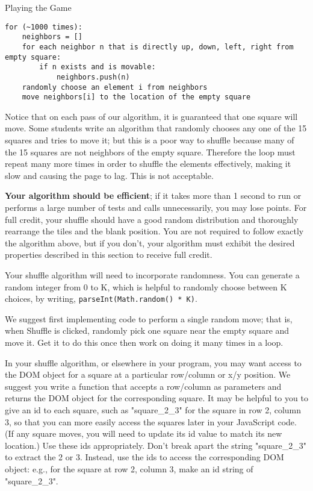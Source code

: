 \documentclass[programming]{../../../../mfcs}
\begin{document}
\begin{question}{Playing the Game}
\begin{lstlisting}
for (~1000 times):
    neighbors = []
    for each neighbor n that is directly up, down, left, right from empty square:
        if n exists and is movable:
            neighbors.push(n)
    randomly choose an element i from neighbors
    move neighbors[i] to the location of the empty square
\end{lstlisting}

Notice that on each pass of our algorithm, it is guaranteed that one square will move. Some students write an
algorithm that randomly chooses any one of the 15 squares and tries to move it; but this is a poor way to shuffle
because many of the 15 squares are not neighbors of the empty square. Therefore the loop must repeat many more
times in order to shuffle the elements effectively, making it slow and causing the page to lag. This is not acceptable.
\newline

\textbf{Your algorithm should be efficient}; if it takes more than 1 second to run or performs a large number of tests and
calls unnecessarily, you may lose points. For full credit, your shuffle should have a good random distribution and
thoroughly rearrange the tiles and the blank position. You are not required to follow exactly the algorithm above,
but if you don't, your algorithm must exhibit the desired properties described in this section to receive full credit.
\newline

Your shuffle algorithm will need to incorporate randomness. You can generate a random integer from 0 to K,
  which is helpful to randomly choose between K choices, by writing, \texttt{parseInt(Math.random() * K)}.
\newline

We suggest first implementing code to perform a single random move; that is, when Shuffle is clicked, randomly pick
one square near the empty square and move it. Get it to do this once then work on doing it many times in a loop.
\newline

In your shuffle algorithm, or elsewhere in your program, you may want access to the DOM object for a square at a
particular row/column or x/y position. We suggest you write a function that accepts a row/column as parameters
and returns the DOM object for the corresponding square. It may be helpful to you to give an id to each square,
such as "square\_2\_3" for the square in row 2, column 3, so that you can more easily access the squares later in
your JavaScript code. (If any square moves, you will need to update its id value to match its new location.)
Use these ids appropriately. Don't break apart the string "square\_2\_3" to extract the 2 or 3. Instead, use the ids
to access the corresponding DOM object: e.g., for the square at row 2, column 3, make an id string of
"square\_2\_3".
\end{question}
\end{document}
